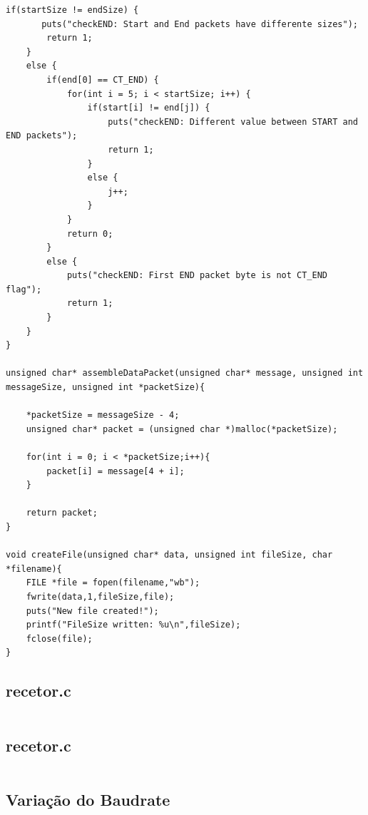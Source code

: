 \documentclass{article}
\begin{document}
\begin{lstlisting}[style=CStyle]
    if(startSize != endSize) {
       puts("checkEND: Start and End packets have differente sizes");
        return 1;
    }
    else {
        if(end[0] == CT_END) {
            for(int i = 5; i < startSize; i++) {
                if(start[i] != end[j]) {
                    puts("checkEND: Different value between START and END packets");
                    return 1;
                }
                else {
                    j++;
                }  
            }
            return 0;
        }
        else {
            puts("checkEND: First END packet byte is not CT_END flag");
            return 1;
        }
    }
}

unsigned char* assembleDataPacket(unsigned char* message, unsigned int messageSize, unsigned int *packetSize){

    *packetSize = messageSize - 4;
    unsigned char* packet = (unsigned char *)malloc(*packetSize);

    for(int i = 0; i < *packetSize;i++){
        packet[i] = message[4 + i];
    }

    return packet;
}

void createFile(unsigned char* data, unsigned int fileSize, char *filename){
    FILE *file = fopen(filename,"wb");
    fwrite(data,1,fileSize,file);
    puts("New file created!");
    printf("FileSize written: %u\n",fileSize);
    fclose(file);
}

\end{lstlisting}


\subsection{recetor.c}

\begin{lstlisting}[style=CStyle]

\end{lstlisting}


\subsection{recetor.c}

\begin{lstlisting}[style=CStyle]

\end{lstlisting}

 
\subsection{Variação do Baudrate}
\end{document}
